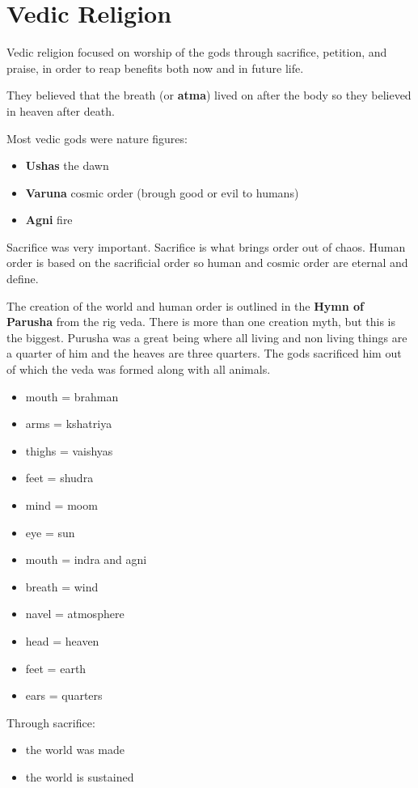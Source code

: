 \documentclass{article}
\begin{document}
\section*{Vedic Religion}
\label{sec:vedic_religion}
Vedic religion focused on worship of the gods through sacrifice, petition, and praise, in order to reap benefits both now and in future life.

They believed that the breath (or \textbf{atma}) lived on after the body so they believed in heaven after death.

Most vedic gods were nature figures:
\begin{itemize}
	\item \textbf{Ushas} the dawn
	\item \textbf{Varuna} cosmic order (brough good or evil to humans)
	\item \textbf{Agni} fire
\end{itemize}

Sacrifice was very important. Sacrifice is what brings order out of chaos. Human order is based on the sacrificial order so human and cosmic order are eternal and define.

The creation of the world and human order is outlined in the \textbf{Hymn of Parusha} from the rig veda. There is more than one creation myth, but this is the biggest. Purusha was a great being where all living and non living things are a quarter of him  and the heaves are three quarters. The gods sacrificed him out of which the veda was formed along with all animals.
\begin{itemize}
	\item mouth = brahman
	\item arms = kshatriya
	\item thighs = vaishyas
	\item feet = shudra
	\item mind = moom
	\item eye = sun
	\item mouth = indra and agni
	\item breath = wind
	\item navel = atmosphere
	\item head = heaven
	\item feet = earth
	\item ears = quarters
\end{itemize}

Through sacrifice:
\begin{itemize}
	\item the world was made
	\item the world is sustained
\end{itemize}
\end{document}

